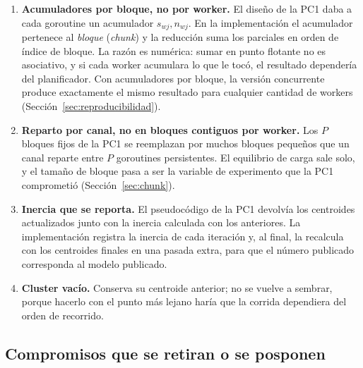 \begin{enumerate}
  \item \textbf{Acumuladores por bloque, no por worker.} El diseño de la PC1 daba a cada goroutine
        un acumulador $s_{wj}, n_{wj}$. En la implementación el acumulador pertenece al
        \emph{bloque} (\emph{chunk}) y la reducción suma los parciales en orden de índice de bloque.
        La razón es numérica: sumar en punto flotante no es asociativo, y si cada worker acumulara
        lo que le tocó, el resultado dependería del planificador. Con acumuladores por bloque, la
        versión concurrente produce exactamente el mismo resultado para cualquier cantidad de
        workers (Sección~\ref{sec:reproducibilidad}).
  \item \textbf{Reparto por canal, no en bloques contiguos por worker.} Los $P$ bloques fijos de la
        PC1 se reemplazan por muchos bloques pequeños que un canal reparte entre $P$ goroutines
        persistentes. El equilibrio de carga sale solo, y el tamaño de bloque pasa a ser la variable
        de experimento que la PC1 comprometió (Sección~\ref{sec:chunk}).
  \item \textbf{Inercia que se reporta.} El pseudocódigo de la PC1 devolvía los centroides
        actualizados junto con la inercia calculada con los anteriores. La implementación registra
        la inercia de cada iteración y, al final, la recalcula con los centroides finales en una
        pasada extra, para que el número publicado corresponda al modelo publicado.
  \item \textbf{Cluster vacío.} Conserva su centroide anterior; no se vuelve a sembrar, porque
        hacerlo con el punto más lejano haría que la corrida dependiera del orden de recorrido.
\end{enumerate}

\subsection{Compromisos que se retiran o se posponen}

